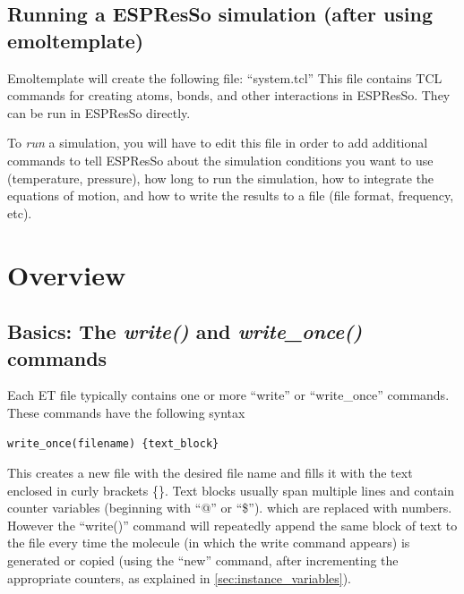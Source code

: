 \documentclass[11pt]{article}
\begin{document}
\subsection{Running a ESPResSo simulation (after using emoltemplate)}
\label{sec:run}
Emoltemplate will create the following file: 
``system.tcl''
This file contains TCL commands 
for creating atoms, bonds, and other interactions in ESPResSo.
They can be run in ESPResSo directly.

To \textit{run} a simulation, you will have to 
edit this file in order to add additional
commands to tell ESPResSo about the simulation conditions
you want to use (temperature, pressure), 
how long to run the simulation,
how to integrate the equations of motion,
and how to write the results to a file (file format, frequency, etc).

\pagebreak
\section{Overview}

\subsection{Basics: The \textit{write()} and \textit{write\_once()} commands}
\label{sec:write}
Each ET file typically contains one or more 
``write'' or ``write\_once'' commands. 
These commands have the following syntax 
\begin{verbatim}
write_once(filename) {text_block}
\end{verbatim}
This creates a new file with the desired file name 
and fills it with the text enclosed in curly brackets \{\}.
Text blocks usually span multiple lines and contain counter variables 
(beginning with ``@'' or ``\$'').
which are replaced with numbers.
However the ``write()'' command will repeatedly append the 
same block of text to the file every time the molecule 
(in which the write command appears) is generated or copied 
(using the ``new'' command, 
after incrementing the appropriate counters,
as explained in \ref{sec:instance_variables}).
\end{document}
